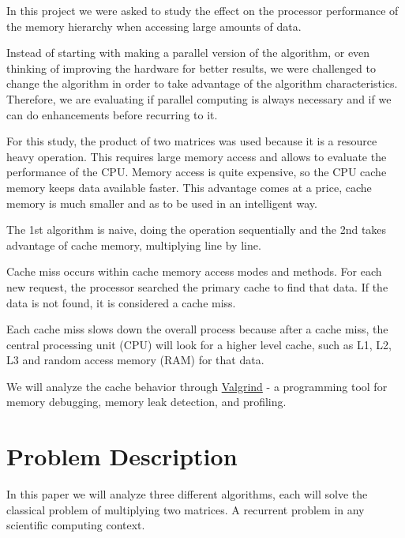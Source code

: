 \documentclass[a4paper]{article}
\begin{document}
In this project we were asked to study the effect on the processor performance of the memory hierarchy when accessing large amounts of data.\par

Instead of starting with making a parallel version of the algorithm, or even thinking of improving the hardware for better results, we were challenged to change the algorithm in order to take advantage of the algorithm characteristics. Therefore, we are evaluating if parallel computing is always necessary and if we can do enhancements before recurring to it.\par

For this study, the product of two matrices was used because it is a resource heavy operation. This requires large memory access and allows to evaluate the performance of the CPU. Memory access is quite expensive, so the CPU cache memory keeps data available faster. This advantage comes at a price, cache memory is much smaller and as to be used in an intelligent way.\par

The 1st algorithm is naive, doing the operation sequentially and the 2nd takes advantage of cache memory, multiplying line by line.\par

Cache miss occurs within cache memory access modes and methods. For each new request, the processor searched the primary cache to find that data. If the data is not found, it is considered a cache miss.\par

Each cache miss slows down the overall process because after a cache miss, the central processing unit (CPU) will look for a higher level cache, such as L1, L2, L3 and random access memory (RAM) for that data.\par

We will analyze the cache behavior through \href{http://valgrind.org}{Valgrind} - a programming tool for memory debugging, memory leak detection, and profiling.

\section{Problem Description}

In this paper we will analyze three different algorithms, each will solve the classical problem of multiplying two matrices. A recurrent problem in any scientific computing context.\par
\end{document}
